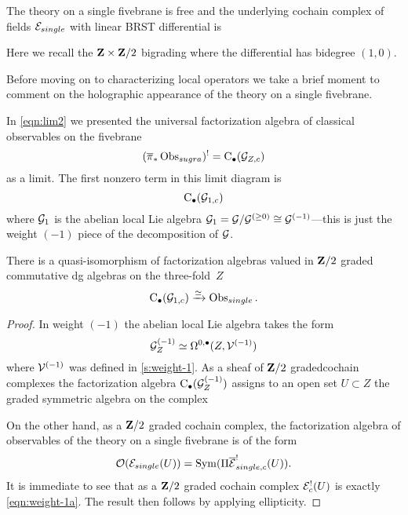 The theory on a single fivebrane is free and the underlying cochain complex of fields $\mathcal E_{single}$ with linear BRST differential is
\beqn
{} 
\eeqn
Here we recall the $\mathbf{Z} \times \mathbf{Z}/2$ bigrading where the differential has bidegree $(1,0)$. 

Before moving on to characterizing local operators we take a brief moment to comment on the holographic appearance of the theory on a single fivebrane. 

\parsec[s:fiverelatesingle]

In \eqref{eqn:lim2} we presented the universal factorization algebra of classical observables on the fivebrane 
\[
(\overline{\pi}_* \operatorname{Obs}_{sugra})^! = {\rm C}_\bullet(\mathcal G_{Z,c}) 
\]
as a limit.
The first nonzero term in this limit diagram is 
\[
{\rm C}_\bullet(\mathcal G_{1,c})
\]
where $\mathcal G_1$ is the abelian local Lie algebra $\mathcal G_{1} = \mathcal G / \mathcal G^{(\geq 0)} \cong \mathcal G^{(-1)}$---this is just the weight $(-1)$ piece of the decomposition of $\mathcal G$. 

\begin{prop}
There is a quasi-isomorphism of factorization algebras valued in $\mathbf{Z}/2$ graded commutative dg algebras on the three-fold~$Z$
\[
{\rm C}_\bullet(\mathcal G_{1,c}) \xrightarrow{\simeq} \operatorname{Obs}_{single} .
\]
\end{prop}

\begin{proof}
In weight $(-1)$ the abelian local Lie algebra takes the form
\[
\mathcal G_Z^{(-1)} \simeq \Omega^{0,\bullet}(Z,\mathcal V^{(-1)}) 
\]
where $\mathcal V^{(-1)}$ was defined in \ref{s:weight-1}.
As a sheaf of $\mathbf{Z}/2$ gradedcochain complexes the factorization algebra ${\rm C}_\bullet(\mathcal G_Z^{(-1)})$ assigns to an open set $U\subset Z$ the graded symmetric algebra on the complex
\beqn\label{eqn:weight-1a}
\eeqn
On the other hand, as a $\mathbf{Z}/2$ graded cochain complex, the factorization algebra of observables of the theory on a single fivebrane is of the form 
\[
\mathcal O(\mathcal E_{single}(U)) = \operatorname{Sym}(\Pi \overline{\mathcal E}_{single,c}^!(U)) .
\]
It is immediate to see that as a $\mathbf{Z}/2$ graded cochain complex $\mathcal E_c^!(U)$ is exactly \eqref{eqn:weight-1a}.
The result then follows by applying ellipticity.
\end{proof}

